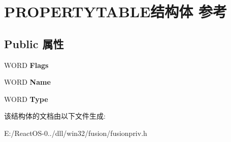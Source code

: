 \hypertarget{struct_p_r_o_p_e_r_t_y_t_a_b_l_e}{}\section{P\+R\+O\+P\+E\+R\+T\+Y\+T\+A\+B\+L\+E结构体 参考}
\label{struct_p_r_o_p_e_r_t_y_t_a_b_l_e}
\subsection*{Public 属性}
\begin{DoxyCompactItemize}
\item 
\mbox{\label{struct_p_r_o_p_e_r_t_y_t_a_b_l_e_aafcd8d0f741a83dfe71cf642ad0329bc}} 
W\+O\+RD {\bfseries Flags}
\item 
\mbox{\label{struct_p_r_o_p_e_r_t_y_t_a_b_l_e_a7207fd9a87bd4530d0adc0ee4b0191bb}} 
W\+O\+RD {\bfseries Name}
\item 
\mbox{\label{struct_p_r_o_p_e_r_t_y_t_a_b_l_e_a1d2610b1c6adb2327f7ca1b42bd027b3}} 
W\+O\+RD {\bfseries Type}
\end{DoxyCompactItemize}


该结构体的文档由以下文件生成\+:\begin{DoxyCompactItemize}
\item 
E\+:/\+React\+O\+S-\/0../dll/win32/fusion/fusionpriv.\+h\end{DoxyCompactItemize}
